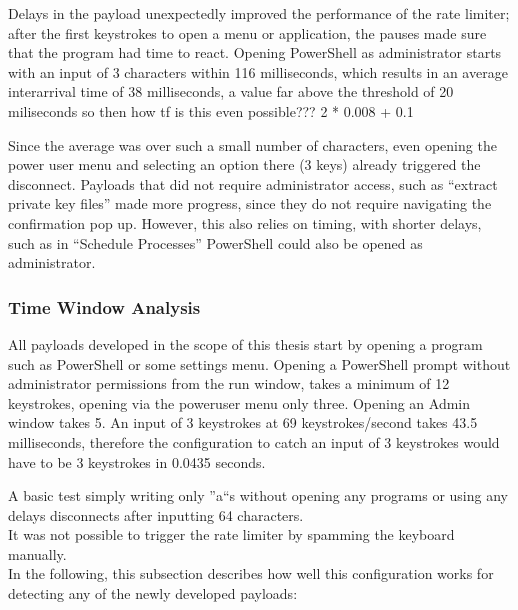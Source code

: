 Delays in the payload unexpectedly improved the performance of the rate limiter; after the first keystrokes to open a menu or application, the pauses made sure that the program had time to react. Opening PowerShell as administrator starts with an input of 3 characters within 116 milliseconds, which results in an average interarrival time of 38 milliseconds, a value far above the threshold of 20 miliseconds  so then how tf is this even possible???
2 * 0.008 + 0.1

Since the average was over such a small number of characters, even opening the power user menu and selecting an option there (3 keys) already triggered the disconnect. Payloads that did not require administrator access, such as ``extract private key files'' made more progress, since they do not require navigating the confirmation pop up. However, this also relies on timing, with shorter delays, such as in ``Schedule Processes'' PowerShell could also be opened as administrator. 


\subsubsection{Time Window Analysis}

All payloads developed in the scope of this thesis start by opening a program such as PowerShell or some settings menu. Opening a PowerShell prompt without administrator permissions from the run window, takes a minimum of 12 keystrokes, opening via the poweruser menu only three. Opening an Admin window takes 5. 
An input of 3 keystrokes at 69 keystrokes/second takes 43.5 milliseconds, therefore the configuration to catch an input of 3 keystrokes would have to be 3 keystrokes in 0.0435 seconds.

A basic test simply writing only ''a``s without opening any programs or using any delays disconnects after inputting 64 characters. \\
It was not possible to trigger the rate limiter by spamming the keyboard manually.\\
In the following, this subsection describes how well this configuration works for detecting any of the newly developed payloads:


